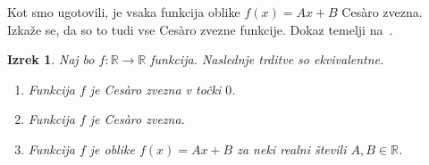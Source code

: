 \documentclass[a4paper,12pt]{article}
\theoremstyle{definition}
\theoremstyle{plain}
\newtheorem{izrek}{Izrek}
\begin{document}
Kot smo ugotovili, je vsaka funkcija oblike $f(x) = Ax + B$ Ces\`{a}ro zvezna. Izkaže se, da so to tudi vse Ces\`{a}ro zvezne funkcije. Dokaz temelji na~\cite[stran 247-248]{2}.

\begin{izrek}
    \label{klaszvez}
    Naj bo $f: \mathbb{R} \rightarrow \mathbb{R}$ funkcija. Naslednje trditve so ekvivalentne.
    \begin{enumerate}
        \item Funkcija $f$ je Ces\`{a}ro zvezna v točki $0$.
        \item Funkcija $f$ je Ces\`{a}ro zvezna.
        \item Funkcija $f$ je oblike $f(x) = Ax + B$ za neki realni števili $A, B \in \mathbb{R}$.
    \end{enumerate}
\end{izrek}
\end{document}
